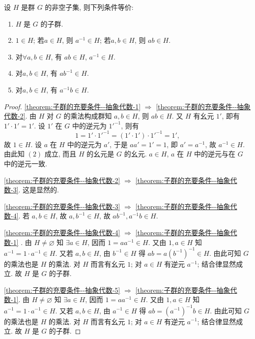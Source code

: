 \documentclass[../../main.tex]{subfiles}%
\begin{document}
\begin{theorem}\label{theorem:子群的充要条件--抽象代数}
设 \( H \) 是群 \( G \) 的非空子集, 则下列条件等价:
\begin{enumerate}[(1)]
\item\label{theorem:子群的充要条件--抽象代数-1} \( H \) 是 \( G \) 的子群.

\item\label{theorem:子群的充要条件--抽象代数-2} \( 1 \in H \); 若\( a \in H \), 则 \( a^{-1} \in H \); 若\( a, b \in H \), 则 \( ab \in H \).

\item\label{theorem:子群的充要条件--抽象代数-3} 对\(\forall a, b \in H \), 有 \( ab \in H \), \( a^{-1} \in H \).

\item\label{theorem:子群的充要条件--抽象代数-4} 对\( a, b \in H \), 有 \( ab^{-1} \in H \).

\item\label{theorem:子群的充要条件--抽象代数-5} 对\( a, b \in H \), 有 \( a^{-1}b \in H \).
\end{enumerate}
\end{theorem}
\begin{proof}
\ref{theorem:子群的充要条件--抽象代数-1} $\Rightarrow$ \ref{theorem:子群的充要条件--抽象代数-2}. 由 \( H \) 对 \( G \) 的乘法构成群知 \( a, b \in H \), 则 \( ab \in H \). 又 \( H \) 有幺元 \( 1' \), 即有 \( 1' \cdot 1' = 1' \). 设 \( 1' \) 在 \( G \) 中的逆元为 \( 1'^{-1} \), 则有
\[
1 = 1' \cdot 1'^{-1} = (1' \cdot 1') \cdot 1'^{-1} = 1',
\]
故 \( 1 \in H \). 设 \( a \) 在 \( H \) 中的逆元为 \( a' \), 于是 \( aa' = 1' = 1 \), 即 \( a' = a^{-1} \), 故 \( a^{-1} \in H \). 由此知 \( (2) \) 成立, 而且 \( H \) 的幺元是 \( G \) 的幺元. \( a \in H \), \( a \) 在 \( H \) 中的逆元与在 \( G \) 中的逆元一致.

\ref{theorem:子群的充要条件--抽象代数-2} $\Rightarrow$ \ref{theorem:子群的充要条件--抽象代数-3}. 这是显然的.

\ref{theorem:子群的充要条件--抽象代数-3} $\Rightarrow$ \ref{theorem:子群的充要条件--抽象代数-4}. 若 \( a, b \in H \), 故 \( a, b^{-1} \in H \), 故 \( ab^{-1},a^{-1}b \in H \).

\ref{theorem:子群的充要条件--抽象代数-4} $\Rightarrow$ \ref{theorem:子群的充要条件--抽象代数-1} . 由 \( H \neq \varnothing \) 知 \( \exists a \in H \), 因而 \( 1 = aa^{-1} \in H \). 又由 \( 1, a \in H \) 知 \( a^{-1} = 1 \cdot a^{-1} \in H \). 又若 \( a, b \in H \), 由 \( b^{-1} \in H \) 得 \( ab = a(b^{-1})^{-1} \in H \). 由此可知 \( G \) 的乘法也是 \( H \) 的乘法. 对 \( H \) 而言有幺元 \( 1 \); 对 \( a \in H \) 有逆元 \( a^{-1} \); 结合律显然成立. 故 \( H \) 是 \( G \) 的子群.

\ref{theorem:子群的充要条件--抽象代数-5} $\Rightarrow$ \ref{theorem:子群的充要条件--抽象代数-1}. 由 \( H \neq \varnothing \) 知 \( \exists a \in H \), 因而 \( 1 = aa^{-1} \in H \). 又由 \( 1, a \in H \) 知 \( a^{-1} = 1 \cdot a^{-1} \in H \). 又若 \( a, b \in H \), 由 \( a^{-1} \in H \) 得 \( ab = (a^{-1})^{-1}b \in H \). 由此可知 \( G \) 的乘法也是 \( H \) 的乘法. 对 \( H \) 而言有幺元 \( 1 \); 对 \( a \in H \) 有逆元 \( a^{-1} \); 结合律显然成立. 故 \( H \) 是 \( G \) 的子群.
\end{proof}
\end{document}
